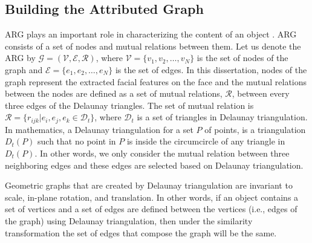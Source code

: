 \subsection{Building the Attributed Graph}
ARG plays an important role in characterizing the content of an
object \cite{park_05}. ARG consists of a set of nodes and mutual
relations between them. Let us denote the ARG by $\mathcal{G} =
(\mathcal{V}, \mathcal{E}, \mathcal{R})$, where $\mathcal{V} =
\{v_1, v_2,\dots,v_N\}$ is the set of nodes of the graph and
$\mathcal{E}=\{e_1, e_2,\dots, e_N\}$ is the set of edges. In this
dissertation, nodes of the graph represent the extracted facial
features on the face and the mutual relations between the nodes are
defined as a set of mutual relations, $\mathcal{R}$, between every
three edges of the Delaunay triangles. The set of mutual relation is
$\mathcal{R}=\{r_{ijk}|e_i,e_j, e_k \in \mathcal{D}_t\}$, where
$\mathcal{D}_t$ is a set of triangles in Delaunay triangulation. In
mathematics, a Delaunay triangulation for a set $P$ of points, is a
triangulation $D_t(P)$ such that no point in $P$ is inside the
circumcircle of any triangle in $D_t(P)$. In other words, we only
consider the mutual relation between three neighboring edges and
these edges are selected based on Delaunay triangulation.

Geometric graphs that are created by Delaunay triangulation are
invariant to scale, in-plane rotation, and translation. In other
words, if an object contains a set of vertices and a set of edges
are defined between the vertices (i.e., edges of the graph) using
Delaunay triangulation, then under the similarity transformation the
set of edges that compose the graph will be the same.

